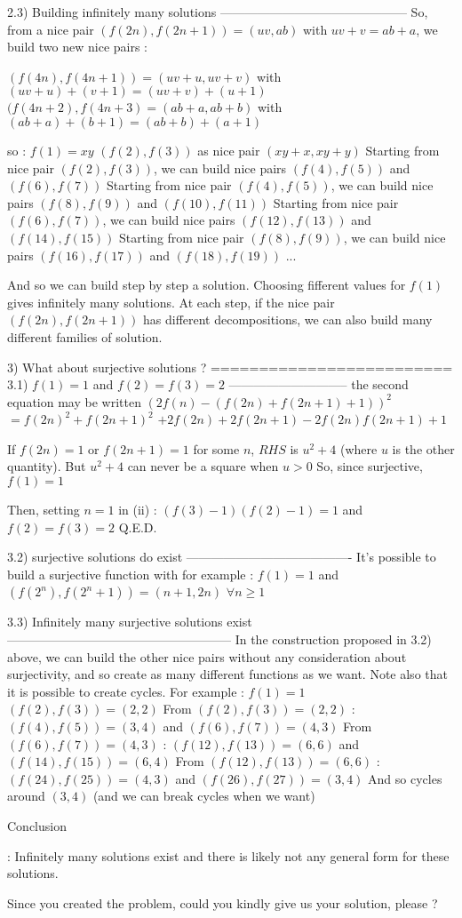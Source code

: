 \begin{solution}
2.3) Building infinitely many solutions
---------------------------------------------
So, from a nice pair $(f(2n),f(2n+1))=(uv,ab)$ with $uv+v=ab+a$, we build two new nice pairs :

$(f(4n),f(4n+1))=(uv+u,uv+v)$ with $(uv+u)+(v+1)=(uv+v)+(u+1)$
$(f(4n+2),f(4n+3)=(ab+a,ab+b)$ with $(ab+a)+(b+1)=(ab+b)+(a+1)$

so :
$f(1)=xy$
$(f(2),f(3))$ as nice pair $(xy+x,xy+y)$
Starting from nice pair $(f(2),f(3))$, we can build nice pairs $(f(4),f(5))$ and $(f(6),f(7))$
Starting from nice pair $(f(4),f(5))$, we can build nice pairs $(f(8),f(9))$ and $(f(10),f(11))$
Starting from nice pair $(f(6),f(7))$, we can build nice pairs $(f(12),f(13))$ and $(f(14),f(15))$
Starting from nice pair $(f(8),f(9))$, we can build nice pairs $(f(16),f(17))$ and $(f(18),f(19))$
...

And so we can build step by step a solution.
Choosing fifferent values for $f(1)$ gives infinitely many solutions.
At each step, if the nice pair $(f(2n),f(2n+1))$ has different decompositions, we can also build many different families of solution.

3) What about surjective solutions ?
=========================
3.1) $f(1)=1$ and $f(2)=f(3)=2$
-----------------------------
the second equation may be written $(2f(n)-(f(2n)+f(2n+1)+1))^2$ $=f(2n)^2+f(2n+1)^2$ $+2f(2n)+2f(2n+1)-2f(2n)f(2n+1)+1$

If $f(2n)=1$ or $f(2n+1)=1$ for some $n$, $RHS$ is $u^2+4$ (where $u$ is the other quantity). But $u^2+4$ can never be a square when $u>0$
So, since surjective, $f(1)=1$ 

Then, setting $n=1$ in (ii) :  $(f(3)-1)(f(2)-1)=1$ and $f(2)=f(3)=2$
Q.E.D.

3.2) surjective solutions do exist
----------------------------------------
It's possible to build a surjective function with for example : $f(1)=1$ and $(f(2^n),f(2^n+1))=(n+1,2n)$ $\forall n\ge 1$

3.3) Infinitely many surjective solutions exist
------------------------------------------------------
In the construction proposed in 3.2) above, we can build the other nice pairs without any consideration about surjectivity, and so create as many different functions as we want.
Note also that it is possible to create cycles. For example :
$f(1)=1$
$(f(2),f(3))=(2,2)$
From $(f(2),f(3))=(2,2)$ : $(f(4),f(5))=(3,4)$ and $(f(6),f(7))=(4,3)$
From $(f(6),f(7))=(4,3)$ : $(f(12),f(13))=(6,6)$ and $(f(14),f(15))=(6,4)$
From $(f(12),f(13))=(6,6)$ : $(f(24),f(25))=(4,3)$ and $(f(26),f(27))=(3,4)$
And so cycles around $(3,4)$ (and we can break cycles when we want)

\begin{bolded}Conclusion \end{bolded}:
Infinitely many solutions exist and there is likely not any general form for these solutions.

Since you created the problem, could you kindly give us your solution, please ?
\end{solution}



